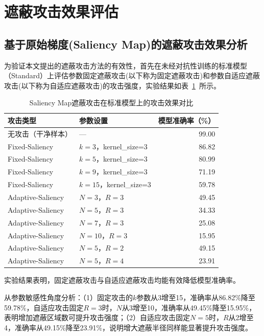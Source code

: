 \section{遮蔽攻击效果评估}

\subsection{基于原始梯度(Saliency Map)的遮蔽攻击效果分析}

为验证本文提出的遮蔽攻击方法的有效性，首先在未经对抗性训练的标准模型（Standard）上评估参数固定遮蔽攻击(以下称为固定遮蔽攻击)和参数自适应遮蔽攻击(以下称为自适应遮蔽攻击)的攻击强度，实验结果如表~\ref{tab:attack_compare}~所示。

\begin{table}[H]
  \centering
  \caption{Saliency Map遮蔽攻击在标准模型上的攻击效果对比}
  \label{tab:attack_compare}
  \begin{tabular}{llr}
    \toprule
    \textbf{攻击类型} & \textbf{参数设置} & \textbf{模型准确率（\%）} \\
    \midrule
    无攻击（干净样本）  & ---              & 99.00 \\
    \midrule
    Fixed-Saliency  & $k=3$，kernel\_size=3    & 86.82 \\
    Fixed-Saliency  & $k=5$，kernel\_size=3    & 80.99 \\
    Fixed-Saliency  & $k=9$，kernel\_size=3    & 71.19 \\
    Fixed-Saliency  & $k=15$，kernel\_size=3   & 59.78 \\
    \midrule
    Adaptive-Saliency  & $N=3$，$R=3$    & 49.45 \\
    Adaptive-Saliency  & $N=5$，$R=3$    & 34.33 \\
    Adaptive-Saliency  & $N=7$，$R=3$    & 25.08 \\
    Adaptive-Saliency  & $N=10$，$R=3$   & 15.95 \\
    \midrule
    Adaptive-Saliency  & $N=5$，$R=2$    & 49.15 \\
    Adaptive-Saliency  & $N=5$，$R=4$    & 23.91 \\
    \bottomrule
  \end{tabular}
\end{table}

实验结果表明，固定遮蔽攻击与自适应遮蔽攻击均能有效降低模型准确率。

从参数敏感性角度分析：（1）固定攻击的$k$参数从3增至15，准确率从86.82\%降至59.78\%，自适应攻击固定$R=3$时，$N$从3增至10，准确率从49.45\%降至15.95\%，表明增加遮蔽区域数可提升攻击强度；（2）自适应攻击固定$N=5$时，$R$从2增至4，准确率从49.15\%降至23.91\%，说明增大遮蔽半径同样能显著提升攻击强度。

